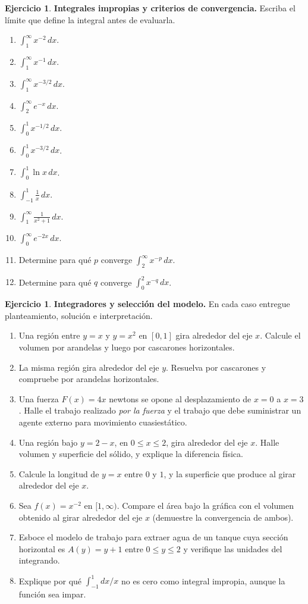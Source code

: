 \documentclass[12pt]{article}
\theoremstyle{definition}
\newtheorem{Ejer}[teorema]{Ejercicio}
\theoremstyle{remark}
\newcommand{\dd}{\,dx}
\begin{document}
\begin{Ejer}\textbf{Integrales impropias y criterios de convergencia.} Escriba el límite que define la integral antes de evaluarla.
\begin{enumerate}[resume=banco3]
\item $\displaystyle\int_1^\infty x^{-2}\dd$.
\item $\displaystyle\int_1^\infty x^{-1}\dd$.
\item $\displaystyle\int_1^\infty x^{-3/2}\dd$.
\item $\displaystyle\int_2^\infty e^{-x}\dd$.
\item $\displaystyle\int_0^1x^{-1/2}\dd$.
\item $\displaystyle\int_0^1x^{-3/2}\dd$.
\item $\displaystyle\int_0^1\ln x\dd$.
\item $\displaystyle\int_{-1}^1\frac1x\dd$.
\item $\displaystyle\int_1^\infty\frac{1}{x^2+1}\dd$.
\item $\displaystyle\int_0^\infty e^{-2x}\dd$.
\item Determine para qué $p$ converge $\displaystyle\int_2^\infty x^{-p}\dd$.
\item Determine para qué $q$ converge $\displaystyle\int_0^2x^{-q}\dd$.
\end{enumerate}
\end{Ejer}

\begin{Ejer}\textbf{Integradores y selección del modelo.} En cada caso entregue planteamiento, solución e interpretación.
\begin{enumerate}[resume=banco3]
\item Una región entre $y=x$ y $y=x^2$ en $[0,1]$ gira alrededor del eje $x$. Calcule el volumen por arandelas y luego por cascarones horizontales.
\item La misma región gira alrededor del eje $y$. Resuelva por cascarones y compruebe por arandelas horizontales.
\item Una fuerza $F(x)=4x$ newtons se opone al desplazamiento de $x=0$ a $x=3$. Halle el trabajo realizado \emph{por la fuerza} y el trabajo que debe suministrar un agente externo para movimiento cuasiestático.
\item Una región bajo $y=2-x$, en $0\le x\le2$, gira alrededor del eje $x$. Halle volumen y superficie del sólido, y explique la diferencia física.
\item Calcule la longitud de $y=x$ entre $0$ y $1$, y la superficie que produce al girar alrededor del eje $x$.
\item Sea $f(x)=x^{-2}$ en $[1,\infty)$. Compare el área bajo la gráfica con el volumen obtenido al girar alrededor del eje $x$ (demuestre la convergencia de ambos).
\item Esboce el modelo de trabajo para extraer agua de un tanque cuya sección horizontal es $A(y)=y+1$ entre $0\le y\le2$ y verifique las unidades del integrando.
\item Explique por qué $\int_{-1}^1dx/x$ no es cero como integral impropia, aunque la función sea impar.
\end{enumerate}
\end{Ejer}
\end{document}
